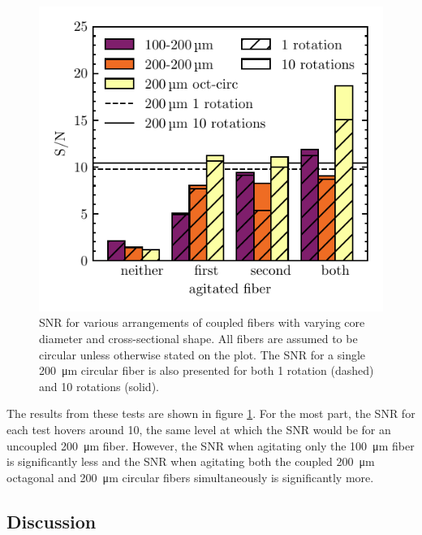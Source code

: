 \documentclass[twocolumn]{emulateapj}
\begin{document}
\begin{figure}
\centering
	\includegraphics[width=\columnwidth]{images/coupled_fibers.pdf}
	\caption{SNR for various arrangements of coupled fibers with varying core diameter and cross-sectional shape. All fibers are assumed to be circular unless otherwise stated on the plot. The SNR for a single \SI{200}{\micro\meter} circular fiber is also presented for both 1 rotation (dashed) and 10 rotations (solid).}
\label{fig:coupled_fibers}
\end{figure}

The results from these tests are shown in figure \ref{fig:coupled_fibers}. For the most part, the SNR for each test hovers around 10, the same level at which the SNR would be for an uncoupled \SI{200}{\micro\meter} fiber. However, the SNR when agitating only the \SI{100}{\micro\meter} fiber is significantly less and the SNR when agitating both the coupled \SI{200}{\micro\meter} octagonal and \SI{200}{\micro\meter} circular fibers simultaneously is significantly more.

\subsection{Discussion}
\label{subsec:discussion}
\end{document}
